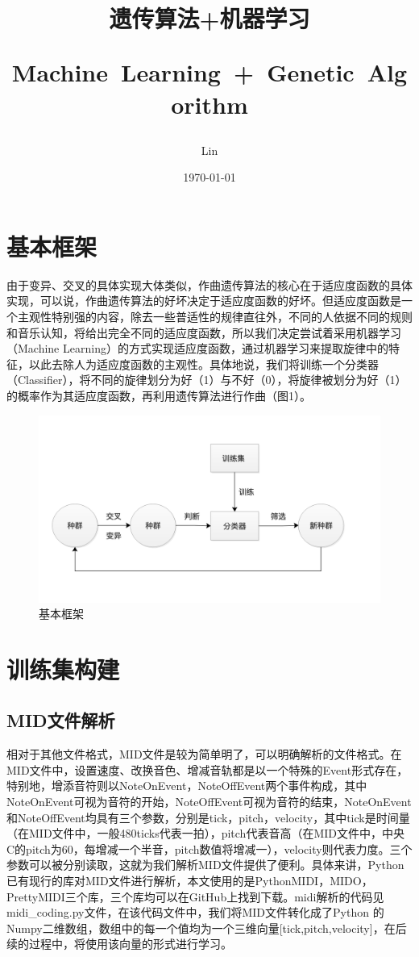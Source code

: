 \documentclass[UTF8,a4paper,10pt]{ctexart}
\title{\textcolor[rgb]{0,0.3,0.6}{\textbf{遗传算法+机器学习 }\\ [2ex] \begin{large} Machine\  Learning\  +\  Genetic\ Algorithm\end{large}}}
\author{Lin}
\date{\today}
\begin{document}
\maketitle
\section{\textcolor[rgb]{0,0.3,0.6}{基本框架}}
由于变异、交叉的具体实现大体类似，作曲遗传算法的核心在于适应度函数的具体实现，可以说，作曲遗传算法的好坏决定于适应度函数的好坏。但适应度函数是一个主观性特别强的内容，除去一些普适性的规律直往外，不同的人依据不同的规则和音乐认知，将给出完全不同的适应度函数，所以我们决定尝试着采用机器学习（Machine Learning）的方式实现适应度函数，通过机器学习来提取旋律中的特征，以此去除人为适应度函数的主观性。具体地说，我们将训练一个分类器（Classifier），将不同的旋律划分为好（1）与不好（0），将旋律被划分为好（1）的概率作为其适应度函数，再利用遗传算法进行作曲（图1）。
\begin{figure}[H]
\begin{center}
	\includegraphics[width=0.7\columnwidth]{flow_chart.png}
	\caption{基本框架}
\end{center}
\end{figure}

\section{\textcolor[rgb]{0,0.3,0.6}{训练集构建}}
\subsection{MID文件解析}
相对于其他文件格式，MID文件是较为简单明了，可以明确解析的文件格式。在MID文件中，设置速度、改换音色、增减音轨都是以一个特殊的Event形式存在，特别地，增添音符则以NoteOnEvent，NoteOffEvent两个事件构成，其中NoteOnEvent可视为音符的开始，NoteOffEvent可视为音符的结束，NoteOnEvent和NoteOffEvent均具有三个参数，分别是tick，pitch，velocity，其中tick是时间量（在MID文件中，一般480ticks代表一拍），pitch代表音高（在MID文件中，中央C的pitch为60，每增减一个半音，pitch数值将增减一），velocity则代表力度。三个参数可以被分别读取，这就为我们解析MID文件提供了便利。具体来讲，Python已有现行的库对MID文件进行解析，本文使用的是PythonMIDI，MIDO，PrettyMIDI三个库，三个库均可以在GitHub上找到下载。midi解析的代码见midi\_coding.py文件，在该代码文件中，我们将MID文件转化成了Python 的Numpy二维数组，数组中的每一个值均为一个三维向量[tick,pitch,velocity]，在后续的过程中，将使用该向量的形式进行学习。
\end{document}
